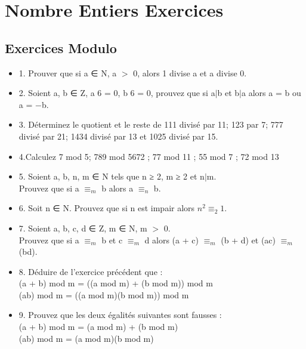 \newpage

\chapter{Nombre Entiers Exercices}

\vspace{3mm} %
\section{Exercices Modulo}
\vspace{3mm} %

\begin{itemize}

\item {1. Prouver que si a ∈ N, a $>$ 0, alors 1 divise a et a divise 0. }

\item {2. Soient a, b ∈ Z, a 6 = 0, b 6 = 0, prouvez que si a$|$b et b$|$a alors a = b ou a = −b.}

\item {3. Déterminez le quotient et le reste de 111 divisé par 11; 123 par 7; 777
divisé par 21; 1434 divisé par 13 et 1025 divisé par 15.}

\item {4.Calculez 7 mod 5; 789 mod 5672 ; 77 mod 11 ; 55 mod 7 ; 72 mod 13}

\item{5. Soient a, b, n, m ∈ N tels que n ≥ 2, m ≥ 2 et n$|$m. \\
 Prouvez que si a $≡_{m}$ b alors a $≡_{n}$ b.}

\item {6. Soit n ∈ N. Prouvez que si n est impair alors $n^{2} ≡_{2} 1$.}

\item {7. Soient a, b, c, d ∈ Z, m ∈ N, m $>$ 0. \\
    Prouvez que si a $≡_{m}$ b et c $≡_{m}$ d alors (a + c) $≡_{m}$ (b + d) et (ac) $≡_{m}$ (bd).}

\item {8. Déduire de l’exercice précédent que :\\
      (a + b) mod m = ((a mod m) + (b mod m)) mod m \\
      (ab) mod m = ((a mod m)(b mod m)) mod m }

\item {9. Prouvez que les deux égalités suivantes sont fausses : \\
      (a + b) mod m = (a mod m) + (b mod m) \\
      (ab) mod m = (a mod m)(b mod m)}
\end{itemize}


